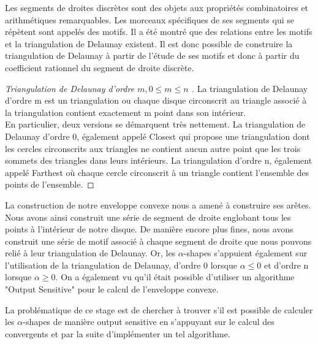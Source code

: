 Les segments de droites discrètes sont des objets aux propriétés combinatoires et arithmétiques remarquables. Les morceaux spécifiques de ses segments qui se répètent sont appelés des motifs. Il a été montré que des relations entre les motifs et la triangulation de Delaunay existent. Il est donc possible de construire la triangulation de Delaunay à partir de l'étude de ses motifs et donc à partir du coefficient rationnel du segment de droite discrète.
\begin{Definition}{}
\label{def:}

\end{Definition}
\begin{proof}[Triangulation de Delaunay d'ordre $m, 0 \leq m \leq n$ ]
  La triangulation de Delaunay d'ordre m est un triangulation ou chaque disque circonscrit au triangle associé à la triangulation contient exactement m point dans son intérieur.\\
 
  En particulier, deux versions se démarquent très nettement. La triangulation de Delaunay d'ordre 0, également appelé Closest qui propose une triangulation dont les cercles circonscrits aux triangles ne contient aucun autre point que les trois sommets des triangles dans leurs intérieurs. La triangulation d'ordre n, également appelé Farthest où chaque cercle circonscrit à un triangle contient l'ensemble des points de  l'ensemble.
\end{proof}

La construction de notre enveloppe convexe nous a amené à construire ses arêtes. Nous avons ainsi construit une série de segment de droite englobant tous les points à l'intérieur de notre disque. De manière encore plus fines, nous avons construit une série de motif associé à chaque segment de droite que nous pouvons relié à leur triangulation de Delaunay. Or, les $\alpha$-shapes s’appuient également sur l'utilisation de la triangulation de Delaunay, d'ordre 0 lorsque $\alpha \leq 0$ et d'ordre n lorsque $\alpha \geq 0$. On a également vu qu'il était possible d'utiliser un algorithme "Output Sensitive" pour le calcul de l'enveloppe convexe.

La problématique de ce stage est de chercher à trouver s'il est possible de calculer les $\alpha$-shapes de manière output sensitive en s'appuyant sur le calcul des convergents et par la suite d'implémenter un tel algorithme.  

